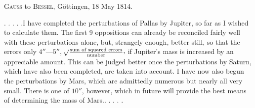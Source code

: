 \par{}\bigskip
\begin{center}
\textsc{Gauss} to \textsc{Bessel}, Göttingen, 18 May 1814.
\end{center}
\noindent\hspace*{\parindent}. . . . .\quad I have completed the perturbations of Pallas by Jupiter, so far as I wished to calculate them. The first 9 oppositions can already be reconciled fairly well with these perturbations alone, but, strangely enough,  better still, so that the errors  only \(4''\text{—}5''\), \(\BareRoot{\frac{\text{sum of squared errors}}{\text{number}}}\mathpunct{\raisebox{.45ex}{,}}\) if Jupiter's mass is increased by an appreciable amount. This can be judged better once the perturbations by Saturn, which have also been completed, are taken into account. I have now also begun the perturbations by Mars, which are admittedly numerous but nearly all very small. There is one of \(10''\), however, which in future will provide the best means of determining the mass of Mars.\quad . . . . .
\par
